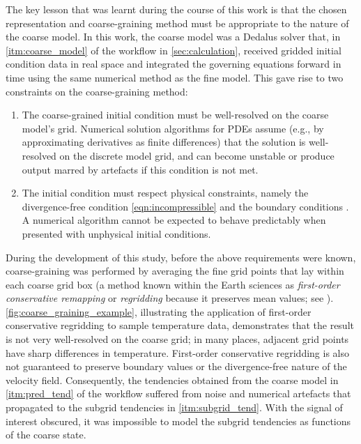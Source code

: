 \documentclass[../main.tex]{subfiles}
\begin{document}
The key lesson that was learnt during the course of this work is that the
chosen representation and coarse-graining method must be appropriate to the
nature of the coarse model. In this work, the coarse model was a Dedalus solver
that, in \cref{itm:coarse_model} of the workflow in \cref{sec:calculation},
received gridded initial condition data in real space and integrated the
governing equations forward in time using the same numerical method as the
fine model. This gave rise to two constraints on the coarse-graining method:
\begin{enumerate}
    \item The coarse-grained initial condition must be well-resolved on the
        coarse model's grid. Numerical solution algorithms for PDEs assume
        (e.g., by approximating derivatives as finite differences) that the
        solution is well-resolved on the discrete model grid, and can become
        unstable or produce output marred by artefacts if this condition is not
        met.
    \item The initial condition must respect physical constraints, namely the
        divergence-free condition \cref{eqn:incompressible} and the boundary
        conditions . A numerical
        algorithm cannot be expected to behave predictably when presented with
        unphysical initial conditions.
\end{enumerate}

During the development of this study, before the above requirements were known,
coarse-graining was performed by averaging the fine grid points that lay within
each coarse grid box (a method known within the Earth sciences as
\emph{first-order conservative remapping} or \emph{regridding} because it
preserves mean values; see \cite{jones1999}).
\cref{fig:coarse_graining_example}, illustrating the application of first-order
conservative regridding to sample temperature data, demonstrates that the
result is not very well-resolved on the coarse grid; in many places, adjacent
grid points have sharp differences in temperature. First-order conservative
regridding is also not guaranteed to preserve boundary values or the
divergence-free nature of the velocity field. Consequently, the tendencies
obtained from the coarse model in \cref{itm:pred_tend} of the workflow suffered
from noise and numerical artefacts that propagated to the subgrid tendencies in
\cref{itm:subgrid_tend}. With the signal of interest obscured, it was
impossible to model the subgrid tendencies as functions of the coarse state.
\end{document}
